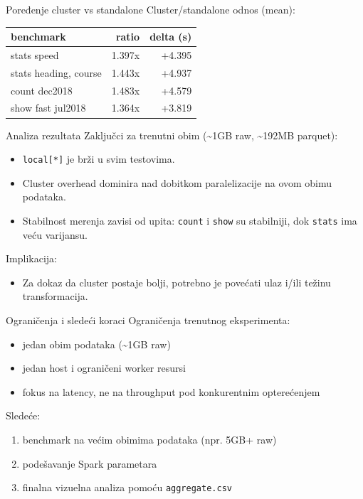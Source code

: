 \documentclass[aspectratio=169,11pt]{beamer}
\newcommand{\code}[1]{\texttt{\small #1}}
\begin{document}
\begin{frame}{Poređenje cluster vs standalone}
  Cluster/standalone odnos (mean):

  \vspace{0.25cm}
  \begin{tabular}{lrr}
    \toprule
    benchmark & ratio & delta (s) \\
    \midrule
    stats speed & 1.397x & +4.395 \\
    stats heading, course & 1.443x & +4.937 \\
    count dec2018 & 1.483x & +4.579 \\
    show fast jul2018 & 1.364x & +3.819 \\
    \bottomrule
  \end{tabular}
\end{frame}

\begin{frame}{Analiza rezultata}
  Zaključci za trenutni obim (\textasciitilde 1GB raw, \textasciitilde 192MB parquet):
  \begin{itemize}
    \item \code{local[*]} je brži u svim testovima.
    \item Cluster overhead dominira nad dobitkom paralelizacije na ovom obimu podataka.
    \item Stabilnost merenja zavisi od upita: \code{count} i \code{show} su stabilniji, dok \code{stats} ima veću varijansu.
  \end{itemize}

  \vspace{0.35cm}
  Implikacija:
  \begin{itemize}
    \item Za dokaz da cluster postaje bolji, potrebno je povećati ulaz i/ili težinu transformacija.
  \end{itemize}
\end{frame}

\begin{frame}{Ograničenja i sledeći koraci}
  Ograničenja trenutnog eksperimenta:
  \begin{itemize}
    \item jedan obim podataka (\textasciitilde 1GB raw)
    \item jedan host i ograničeni worker resursi
    \item fokus na latency, ne na throughput pod konkurentnim opterećenjem
  \end{itemize}

  \vspace{0.35cm}
  Sledeće:
  \begin{enumerate}
    \item benchmark na većim obimima podataka (npr. 5GB+ raw)
    \item podešavanje Spark parametara
    \item finalna vizuelna analiza pomoću \code{aggregate.csv}
  \end{enumerate}
\end{frame}
\end{document}

